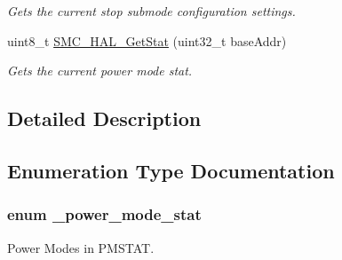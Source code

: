 \begin{DoxyCompactItemize}
\begin{DoxyCompactList}\small\item\em Gets the current stop submode configuration settings. \end{DoxyCompactList}\item 
uint8\+\_\+t \hyperlink{group__smc__hal_gaa2521b7fd5a4b3408bcf1098e2ffe650}{S\+M\+C\+\_\+\+H\+A\+L\+\_\+\+Get\+Stat} (uint32\+\_\+t base\+Addr)
\begin{DoxyCompactList}\small\item\em Gets the current power mode stat. \end{DoxyCompactList}\end{DoxyCompactItemize}


\subsection{Detailed Description}


\subsection{Enumeration Type Documentation}
\subsubsection[{\texorpdfstring{\+\_\+power\+\_\+mode\+\_\+stat}{_power_mode_stat}}]{\setlength{\rightskip}{0pt plus 5cm}enum {\bf \+\_\+power\+\_\+mode\+\_\+stat}}\hypertarget{group__smc__hal_ga50d35fdd2a2912b96e155d3f0dd395a4}{}\label{group__smc__hal_ga50d35fdd2a2912b96e155d3f0dd395a4}


Power Modes in P\+M\+S\+T\+AT. 

